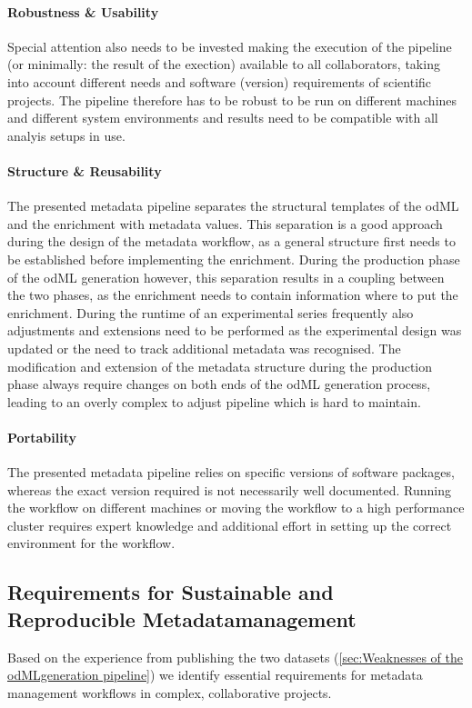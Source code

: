 \paragraph{Robustness \& Usability}
Special attention also needs to be invested making the execution of the pipeline (or minimally: the result of the exection) available to all collaborators, taking into account different needs and software (version) requirements of scientific projects. The pipeline therefore has to be robust to be run on different machines and different system environments and results need to be compatible with all analyis setups in use.

\paragraph{Structure \& Reusability} The presented metadata pipeline separates the structural templates of the odML and the enrichment with metadata values. This separation is a good approach during the design of the metadata workflow, as a general structure first needs to be established before implementing the enrichment. During the production phase of the odML generation however, this separation results in a coupling between the two phases, as the enrichment needs to contain information where to put the enrichment. During the runtime of an experimental series frequently also adjustments and extensions need to be performed as the experimental design was updated or the need to track additional metadata was recognised. The modification and extension of the metadata structure during the production phase always require changes on both ends of the odML generation process, leading to an overly complex to adjust pipeline which is hard to maintain.

\paragraph{Portability} The presented metadata pipeline relies on specific versions of software packages, whereas the exact version required is not necessarily well documented. Running the workflow on different machines or moving the workflow to a high performance cluster requires expert knowledge and additional effort in setting up the correct environment for the workflow.



\subsection{Requirements for Sustainable and Reproducible Metadatamanagement}
Based on the experience from publishing the two datasets (\ref{sec:Weaknesses of the odMLgeneration pipeline}) we identify essential requirements for metadata management workflows in complex, collaborative projects.

